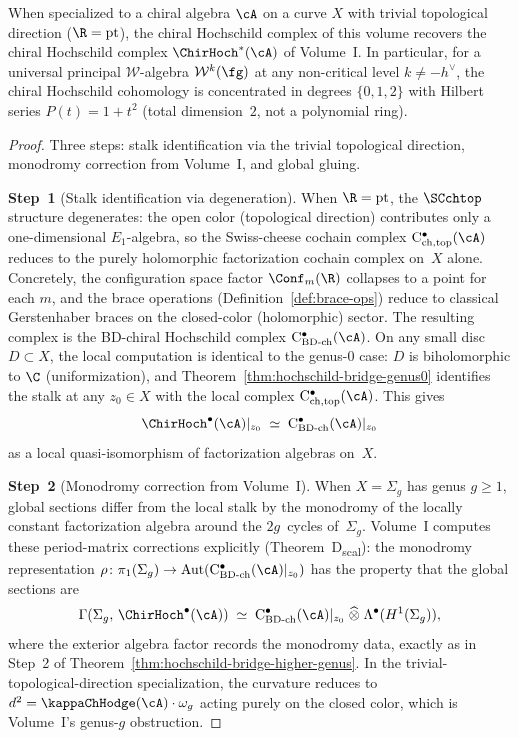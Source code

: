 \begin{corollary}
\label{cor:hochschild-bridge}
When specialized to a chiral algebra $\cA$ on a curve $X$ with
trivial topological direction ($\R = \mathrm{pt}$), the chiral
Hochschild complex of this volume recovers the chiral Hochschild
complex $\ChirHoch^*(\cA)$ of Volume~I\@. In particular, for a
universal principal $\mathcal{W}$-algebra $\mathcal{W}^k(\fg)$ at any
non-critical level $k \neq -h^\vee$, the chiral Hochschild
cohomology is concentrated in degrees $\{0, 1, 2\}$ with
Hilbert series $P(t) = 1 + t^2$
(total dimension~$2$, not a polynomial ring).
\end{corollary}

\begin{proof}
Three steps: stalk identification via the trivial topological
direction, monodromy correction from Volume~I, and global gluing.

\medskip
\noindent\textbf{Step~1} (Stalk identification via degeneration).
When $\R = \mathrm{pt}$, the $\SCchtop$ structure degenerates: the
open color (topological direction) contributes only a one-dimensional
$E_1$-algebra, so the Swiss-cheese cochain complex
$\mathrm{C}^\bullet_{\mathrm{ch,top}}(\cA)$ reduces to the purely
holomorphic factorization cochain complex on~$X$ alone. Concretely,
the configuration space factor $\Conf_m(\R)$ collapses to a point for
each $m$, and the brace operations (Definition~\ref{def:brace-ops})
reduce to classical Gerstenhaber braces on the closed-color
(holomorphic) sector. The resulting complex is the BD-chiral
Hochschild complex $\mathrm{C}^\bullet_{\mathrm{BD\text{-}ch}}(\cA)$.
On any small disc $D \subset X$, the local computation is identical
to the genus-$0$ case: $D$ is biholomorphic to $\C$
(uniformization), and
Theorem~\ref{thm:hochschild-bridge-genus0} identifies the
stalk at any $z_0 \in X$ with the local complex
$\mathrm{C}^\bullet_{\mathrm{ch,top}}(\cA)$. This gives
\[
 \ChirHoch^\bullet(\cA)|_{z_0}
 \;\simeq\;
 \mathrm{C}^\bullet_{\mathrm{BD\text{-}ch}}(\cA)|_{z_0}
\]
as a local quasi-isomorphism of factorization algebras on~$X$.

\medskip
\noindent\textbf{Step~2} (Monodromy correction from Volume~I).
When $X = \Sigma_g$ has genus $g \geq 1$, global sections differ
from the local stalk by the monodromy of the locally constant
factorization algebra around the $2g$~cycles of~$\Sigma_g$.
Volume~I computes these period-matrix corrections explicitly
(Theorem~D\textsubscript{scal}): the monodromy representation
$\rho\colon \pi_1(\Sigma_g) \to
\mathrm{Aut}(\mathrm{C}^\bullet_{\mathrm{BD\text{-}ch}}(\cA)|_{z_0})$
has the property that the global sections are
\[
 \Gamma(\Sigma_g,\, \ChirHoch^\bullet(\cA))
 \;\simeq\;
 \mathrm{C}^\bullet_{\mathrm{BD\text{-}ch}}(\cA)|_{z_0}
 \;\widehat\otimes\;
 \Lambda^\bullet(H^1(\Sigma_g)),
\]
where the exterior algebra factor records the monodromy data,
exactly as in Step~2 of
Theorem~\ref{thm:hochschild-bridge-higher-genus}. In the
trivial-topological-direction specialization, the curvature
reduces to $d^2 = \kappaChHodge(\cA) \cdot \omega_g$ acting purely
on the closed color, which is Volume~I's genus-$g$ obstruction.


\end{proof}
